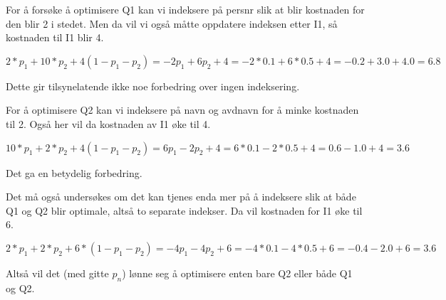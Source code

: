 For å forsøke å optimisere Q1 kan vi indeksere på persnr slik at blir kostnaden for den blir 2 i stedet. Men da vil vi også måtte oppdatere indeksen etter I1, så kostnaden til I1 blir 4.

\[
    2*p_1 + 10*p_2 + 4(1 - p_1 - p_2) = -2p_1 + 6p_2 + 4 = -2*0.1 + 6*0.5 + 4 = -0.2 + 3.0 + 4.0 = 6.8
\]

Dette gir tilsynelatende ikke noe forbedring over ingen indeksering.

For å optimisere Q2 kan vi indeksere på navn og avdnavn for å minke kostnaden til 2. Også her vil da kostnaden av I1 øke til 4.

\[
    10*p_1 + 2*p_2 + 4(1 - p_1 - p_2) = 6p_1 - 2p_2 + 4 = 6*0.1 - 2*0.5 + 4 = 0.6 - 1.0 + 4 = 3.6
\]

Det ga en betydelig forbedring.

Det må også undersøkes om det kan tjenes enda mer på å indeksere slik at både Q1 og Q2 blir optimale, altså to separate indekser. Da vil kostnaden for I1 øke til 6.

\[
    2*p_1 + 2*p_2 + 6*(1 - p_1 - p_2) = -4p_1 - 4p_2 + 6 = -4*0.1 - 4*0.5 + 6 = -0.4 - 2.0 + 6 = 3.6
\]

Altså vil det (med gitte $p_n$) lønne seg å optimisere enten bare Q2 eller både Q1 og Q2.
